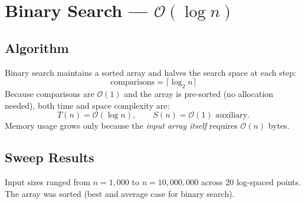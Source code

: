 \documentclass[12pt,a4paper]{report}
\newcommand{\On}[1]{\ensuremath{\mathcal{O}(#1)}}
\begin{document}
\chapter{Binary Search --- \texorpdfstring{\On{\log n}}{O(log n)}}
\label{chap:binary}

\section{Algorithm}

Binary search maintains a sorted array and halves the search space at each step:
\[
  \text{comparisons} = \lceil \log_2 n \rceil
\]
Because comparisons are $\mathcal{O}(1)$ and the array is pre-sorted (no
allocation needed), both time and space complexity are:
\[
  T(n) = \mathcal{O}(\log n), \qquad S(n) = \mathcal{O}(1) \text{ auxiliary}.
\]
Memory usage grows only because the \emph{input array itself} requires $\mathcal{O}(n)$ bytes.

\section{Sweep Results}

Input sizes ranged from $n = 1{,}000$ to $n = 10{,}000{,}000$ across 20 log-spaced points.
The array was sorted (best and average case for binary search).
\end{document}
